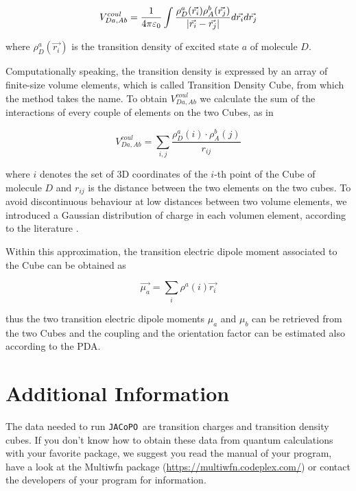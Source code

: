\documentclass[a4paper]{article}
\newcommand{\jacopo}{\texttt{JACoPO}}
\DeclarePairedDelimiter\norm{\lvert}{\rvert}
\begin{document}
\begin{equation}
 V^{coul}_{Da,Ab} = \frac{1}{4\pi\varepsilon_0} \int \frac{\rho_D^a(\vec{r_i})\rho_A^b(\vec{r_j})}{\norm{\vec{r_i} - \vec{r_j}}} d\vec{r_i} d\vec{r_j}
 \label{eq:TDC}
\end{equation}

where $\rho_D^a(\vec{r_i})$ is the transition density of excited state $a$ of molecule $D$.

Computationally speaking, the transition density is expressed by an array of finite-size volume elements, which is called Transition Density Cube, from which the method takes the name. To obtain $V^{coul}_{Da,Ab}$ we calculate the sum of the interactions of every couple of elements on the two Cubes, as in

\begin{equation}
 V^{coul}_{Da,Ab} = \sum_{i,j} \frac{\rho_D^a(i)\cdot \rho_A^b(j)}{r_{ij}}
 \label{eq:TDC1}
\end{equation}

where $i$ denotes the set of 3D coordinates of the $i$-th point of the Cube of molecule $D$ and $r_{ij}$ is the distance between the two elements on the two cubes. To avoid discontinuous behaviour at low distances between two volume elements, we introduced a Gaussian distribution of charge in each volumen element, according to the literature \cite{Sega2014}.

Within this approximation, the transition electric dipole moment associated to the Cube can be obtained as

\begin{equation}
 \vec{\mu_a} = \sum_i \rho^a(i) \vec{r_i}
 \label{eq:mu_TDC}
\end{equation}

thus the two transition electric dipole moments $\mu_a$ and $\mu_b$ can be retrieved from the two Cubes and the coupling and the orientation factor can be estimated also according to the PDA.

\section{Additional Information}
The data needed to run \jacopo\ are transition charges and transition density cubes. If you don't know how to obtain these data from quantum calculations with your favorite package, we suggest you read the manual of your program, have a look at the Multiwfn package (\url{https://multiwfn.codeplex.com/}) or contact the developers of your program for information.
\end{document}

